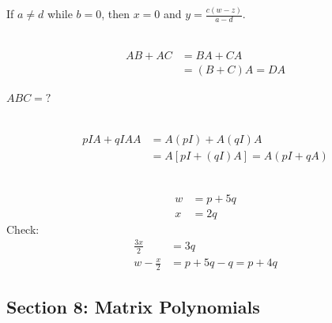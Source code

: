 \documentclass{article}
\begin{document}
\begin{description}
    If $a \neq d$ while $b=0$, then $x=0$ and $y = \frac{c(w-z)}{a-d}$.

  \item[100.] $\ $
    \begin{align*}
    AB + AC & = BA + CA \\
            & = (B+C)A = DA
    \end{align*}

  \item[101.] $ABC = ?$

  \item[103.] $\ $
    \begin{align*}
    pIA + qIAA & = A(pI) + A(qI)A \\
               & = A[pI+(qI)A] = A(pI+qA)
    \end{align*}

  \item[104.] $\ $
    \begin{align*}
    w & = p + 5q \\
    x & = 2q
    \end{align*}
    Check: 
    \begin{align*}
    \frac{3x}{2} & = 3q \\
    w-\frac{x}{2} & = p + 5q - q = p + 4q
    \end{align*}

\end{description}


\subsection*{Section 8: Matrix Polynomials}
\end{document}
